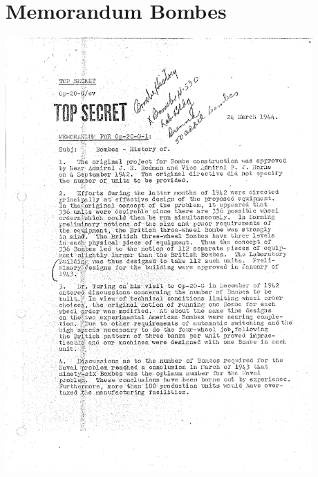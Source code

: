 \documentclass[%
11pt,%
twoside,%
titlepage,%
german,%
headsepline%
]{scrartcl}
\begin{document}
\clearpage

\appendix

\section{Memorandum Bombes}
\includegraphics[width=0.88\textwidth,page=1]{pictures/memorandumbombes.pdf}
\end{document}
